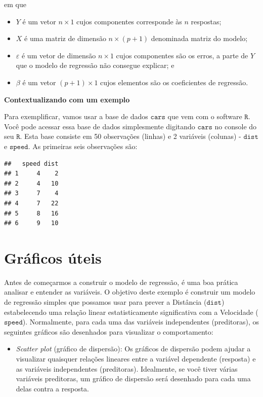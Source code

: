 \documentclass[
]{book}
\providecommand{\tightlist}{%
  \setlength{\itemsep}{0pt}\setlength{\parskip}{0pt}}
\begin{document}
em que

\begin{itemize}
\tightlist
\item
  \(Y\) é um vetor \(n\times 1\) cujos componentes corresponde às \(n\) respostas;
\item
  \(X\) é uma matriz de dimensão \(n\times (p+1)\) denominada matriz do modelo;
\item
  \(\varepsilon\) é um vetor de dimensão \(n\times 1\) cujos componentes são os erros, a parte de \(Y\) que o modelo de regressão não consegue explicar; e
\item
  \(\beta\) é um vetor \((p+1)\times 1\) cujos elementos são os coeficientes de regressão.
\end{itemize}

\textbf{Contextualizando com um exemplo}

Para exemplificar, vamos usar a base de dados \(\texttt{cars}\) que vem com o software \(\texttt{R}\). Você pode acessar essa base de dados simplesmente digitando \(\texttt{cars}\) no console do seu \(\texttt{R}\). Esta base consiste em 50 observações (linhas) e 2 variáveis (colunas) - \(\texttt{dist}\) e \(\texttt{speed}\). As primeiras seis observações são:

\begin{verbatim}
##   speed dist
## 1     4    2
## 2     4   10
## 3     7    4
## 4     7   22
## 5     8   16
## 6     9   10
\end{verbatim}

\hypertarget{gruxe1ficos-uxfateis}{%
\section{Gráficos úteis}\label{gruxe1ficos-uxfateis}}

Antes de começarmos a construir o modelo de regressão, é uma boa prática analisar e entender as variáveis. O objetivo deste exemplo é construir um modelo de regressão simples que possamos usar para prever a Distância (\(\texttt{dist}\)) estabelecendo uma relação linear estatisticamente significativa com a Velocidade (\(\texttt{speed}\)). Normalmente, para cada uma das variáveis independentes (preditoras), os seguintes gráficos são desenhados para visualizar o comportamento:

\begin{itemize}
\tightlist
\item
  \emph{Scatter plot} (gráfico de dispersão): Os gráficos de dispersão podem ajudar a visualizar quaisquer relações lineares entre a variável dependente (resposta) e as variáveis independentes (preditoras). Idealmente, se você tiver várias variáveis preditoras, um gráfico de dispersão será desenhado para cada uma delas contra a resposta.
\end{itemize}
\end{document}
